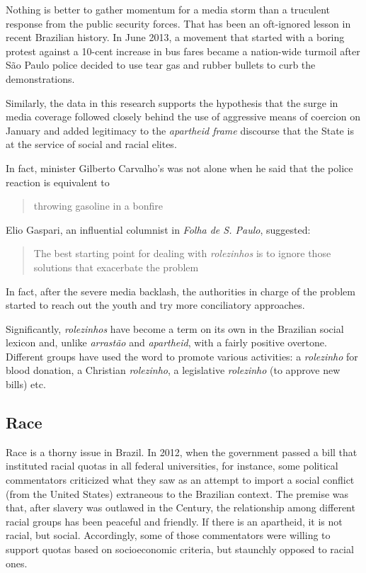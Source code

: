 Nothing is better to gather momentum for a media storm than a truculent response from the public security forces. That has been an oft-ignored lesson in recent Brazilian history. In June 2013, a movement that started with a boring protest against a 10-cent increase in bus fares became a nation-wide turmoil after São Paulo police decided to use tear gas and rubber bullets to curb the demonstrations.

Similarly, the data in this research supports the hypothesis that the surge in media coverage followed closely behind the use of aggressive means of coercion on January  and added legitimacy to the \emph{apartheid frame} discourse that the State is at the service of social and racial elites.

In fact, minister Gilberto Carvalho's was not alone when he said that the police reaction is equivalent to \blockcquote{folha_carvalho_fogo}[.]{throwing gasoline in a bonfire} Elio Gaspari, an influential columnist in \emph{Folha de S. Paulo}, suggested: \blockcquote{eliogaspari}[.]{The best starting point for dealing with \emph{rolezinhos} is to ignore those solutions that exacerbate the problem} In fact, after the severe media backlash, the authorities in charge of the problem started to reach out the youth and try more conciliatory approaches.

Significantly, \emph{rolezinhos} have become a term on its own in the Brazilian social lexicon and, unlike \emph{arrastão} and \emph{apartheid}, with a fairly positive overtone. Different groups have used the word to promote various activities: a \emph{rolezinho} for blood donation, a Christian \emph{rolezinho}, a legislative \emph{rolezinho} (to approve new bills) etc.

\subsection*{Race}

Race is a thorny issue in Brazil. In 2012, when the government passed a bill that instituted racial quotas in all federal universities, for instance, some political commentators criticized what they saw as an attempt to import a social conflict (from the United States) extraneous to the Brazilian context. The premise was that, after slavery was outlawed in the  Century, the relationship among different racial groups has been peaceful and friendly. If there is an apartheid, it is not racial, but social. Accordingly, some of those commentators were willing to support quotas based on socioeconomic criteria, but staunchly opposed to racial ones.

